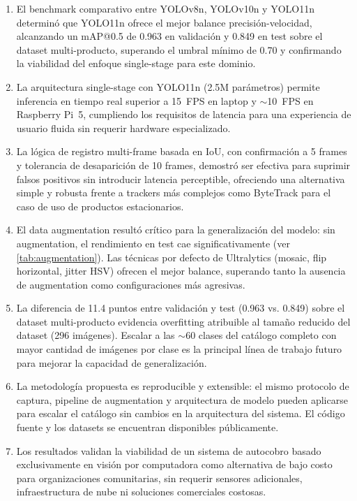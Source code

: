 \documentclass[conference,a4paper]{IEEEtran}[2015/08/26]
\begin{document}
\begin{enumerate}
  \item El benchmark comparativo entre YOLOv8n, YOLOv10n y YOLO11n determinó que YOLO11n ofrece el mejor balance precisión-velocidad, alcanzando un mAP@0.5 de 0.963 en validación y 0.849 en test sobre el dataset multi-producto, superando el umbral mínimo de 0.70 y confirmando la viabilidad del enfoque single-stage para este dominio.

  \item La arquitectura single-stage con YOLO11n (2.5M parámetros) permite inferencia en tiempo real superior a 15~FPS en laptop y $\sim$10~FPS en Raspberry Pi~5, cumpliendo los requisitos de latencia para una experiencia de usuario fluida sin requerir hardware especializado.

  \item La lógica de registro multi-frame basada en IoU, con confirmación a 5 frames y tolerancia de desaparición de 10 frames, demostró ser efectiva para suprimir falsos positivos sin introducir latencia perceptible, ofreciendo una alternativa simple y robusta frente a trackers más complejos como ByteTrack para el caso de uso de productos estacionarios.

  \item El data augmentation resultó crítico para la generalización del modelo: sin augmentation, el rendimiento en test cae significativamente (ver \cref{tab:augmentation}). Las técnicas por defecto de Ultralytics (mosaic, flip horizontal, jitter HSV) ofrecen el mejor balance, superando tanto la ausencia de augmentation como configuraciones más agresivas.

  \item La diferencia de 11.4 puntos entre validación y test (0.963 vs. 0.849) sobre el dataset multi-producto evidencia overfitting atribuible al tamaño reducido del dataset (296 imágenes). Escalar a las $\sim$60 clases del catálogo completo con mayor cantidad de imágenes por clase es la principal línea de trabajo futuro para mejorar la capacidad de generalización.

  \item La metodología propuesta es reproducible y extensible: el mismo protocolo de captura, pipeline de augmentation y arquitectura de modelo pueden aplicarse para escalar el catálogo sin cambios en la arquitectura del sistema. El código fuente y los datasets se encuentran disponibles públicamente.

  \item Los resultados validan la viabilidad de un sistema de autocobro basado exclusivamente en visión por computadora como alternativa de bajo costo para organizaciones comunitarias, sin requerir sensores adicionales, infraestructura de nube ni soluciones comerciales costosas.
\end{enumerate}
\end{document}
